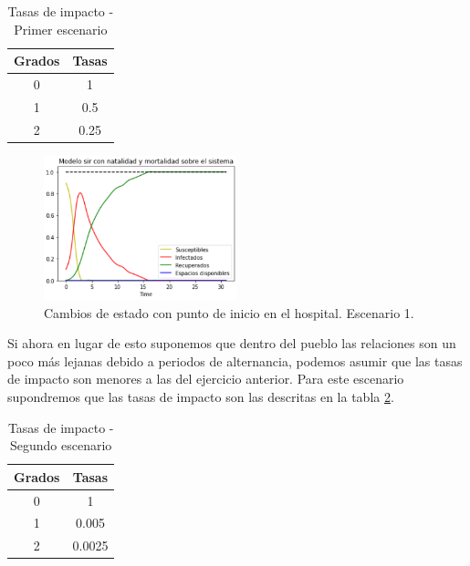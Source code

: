 \newpage

\begin{table}[h]
\begin{center}
\begin{tabular}{| c | c |}
\hline
Grados & Tasas \\ \hline
0 & 1 \\
1 & 0.5 \\
2 & 0.25 \\\hline
\end{tabular}
\caption{Tasas de impacto - Primer escenario}
\label{tab:tasasDeImpacto1}
\end{center}
\end{table}

\begin{figure}[h]
  \centering
    \includegraphics[width=0.5\textwidth]{Imagenes/metricas1.PNG}
    \caption{Cambios de estado con punto de inicio en el hospital. Escenario 1.}
    \label{fig:metricas1}
\end{figure}

Si ahora en lugar de esto suponemos que dentro del pueblo las relaciones son un poco más lejanas debido a periodos de alternancia, podemos asumir que las tasas de impacto son menores a las del ejercicio anterior. Para este escenario supondremos que las tasas de impacto son las descritas en la tabla \ref{tab:tasasDeImpacto2}.

\begin{table}[h]
\begin{center}
\begin{tabular}{| c | c |}
\hline
Grados & Tasas \\ \hline
0 & 1 \\
1 & 0.005 \\
2 & 0.0025 \\\hline
\end{tabular}
\caption{Tasas de impacto - Segundo escenario}
\label{tab:tasasDeImpacto2}
\end{center}
\end{table}

